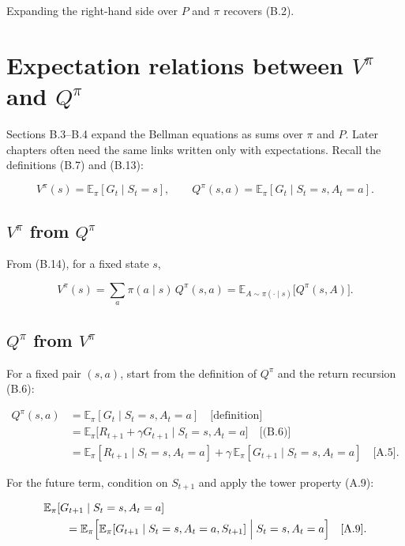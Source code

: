 Expanding the right-hand side over $P$ and $\pi$ recovers (B.2).

\section{Expectation relations between $V^\pi$ and $Q^\pi$}

Sections B.3--B.4 expand the Bellman equations as sums over $\pi$ and $P$. Later chapters often need the same links written only with expectations. Recall the definitions (B.7) and (B.13):

\[
V^\pi(s)
=
\mathbb{E}_\pi[G_t\mid S_t=s],
\qquad
Q^\pi(s,a)
=
\mathbb{E}_\pi[G_t\mid S_t=s,A_t=a].
\]

\subsection{$V^\pi$ from $Q^\pi$}

From (B.14), for a fixed state $s$,

\begin{equation}
V^\pi(s)
=
\sum_a \pi(a\mid s)\, Q^\pi(s,a)
=
\mathbb{E}_{A\sim\pi(\cdot\mid s)}\bigl[Q^\pi(s,A)\bigr].
\tag{B.19}
\end{equation}

\subsection{$Q^\pi$ from $V^\pi$}

For a fixed pair $(s,a)$, start from the definition of $Q^\pi$ and the return recursion (B.6):

\[
\begin{aligned}
Q^\pi(s,a)
&=
\mathbb{E}_\pi[G_t\mid S_t=s,A_t=a]
\quad\text{[definition]}
\\
&=
\mathbb{E}_\pi\bigl[R_{t+1}+\gamma G_{t+1}\mid S_t=s,A_t=a\bigr]
\quad\text{[(B.6)]}
\\
&=
\mathbb{E}_\pi[R_{t+1}\mid S_t=s,A_t=a]
+
\gamma\,
\mathbb{E}_\pi[G_{t+1}\mid S_t=s,A_t=a]
\quad\text{[A.5]}.
\end{aligned}
\]

For the future term, condition on $S_{t+1}$ and apply the tower property (A.9):

\[
\begin{aligned}
&\mathbb{E}_\pi[G_{t+1}\mid S_t=s,A_t=a]
\\
&\qquad=
\mathbb{E}_\pi\Bigl[
\mathbb{E}_\pi[G_{t+1}\mid S_t=s,A_t=a,S_{t+1}]
\Bigm|S_t=s,A_t=a
\Bigr]
\quad\text{[A.9]}.
\end{aligned}
\]

